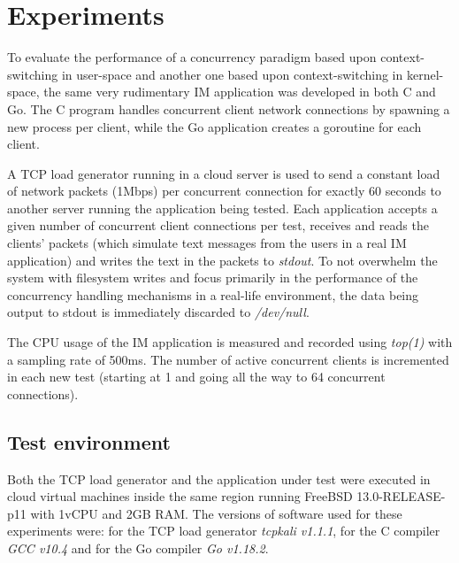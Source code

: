 \section{Experiments}
To evaluate the performance of a concurrency paradigm based upon context-switching in user-space and another one based upon context-switching in kernel-space, the same very rudimentary IM application was developed in both C and Go. The C program handles concurrent client network connections by spawning a new process per client, while the Go application creates a goroutine for each client. 

A TCP load generator running in a cloud server is used to send a constant load of network packets (1Mbps) per concurrent connection for exactly 60 seconds to another server running the application being tested. Each application accepts a given number of concurrent client connections per test, receives and reads the clients' packets (which simulate text messages from the users in a real IM application) and writes the text in the packets to \textit{stdout}. To not overwhelm the system with filesystem writes and focus primarily in the performance of the concurrency handling mechanisms in a real-life environment, the data being output to stdout is immediately discarded to \textit{/dev/null}. 

The CPU usage of the IM application is measured and recorded using \textit{top(1)} with a sampling rate of 500ms. The number of active concurrent clients is incremented in each new test (starting at 1 and going all the way to 64 concurrent connections).

\subsection{Test environment}
Both the TCP load generator and the application under test were executed in cloud virtual machines inside the same region running FreeBSD 13.0-RELEASE-p11 with 1vCPU and 2GB RAM. The versions of software used for these experiments were: for the TCP load generator \textit{tcpkali v1.1.1}, for the C compiler \textit{GCC v10.4} and for the Go compiler \textit{Go v1.18.2}.

